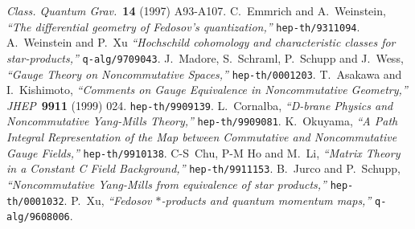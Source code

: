 \documentclass[10pt,a4paper]{article}
\begin{document}
\begin{thebibliography}{99}
{\sl Class. Quantum Grav.}~{\bf 14} (1997) A93-A107.
C.~Emmrich and A.~Weinstein,
{\it ``The differential geometry of Fedosov's quantization,''}
{\tt hep-th/9311094}.
A.~Weinstein and P.~Xu
{\it ``Hochschild cohomology and characteristic classes for star-products,''}
{\tt q-alg/9709043}.
J.~Madore, S.~Schraml, P.~Schupp and J.~Wess,
{\it ``Gauge Theory on Noncommutative Spaces,''}
{\tt hep-th/0001203}.
T.~Asakawa and I.~Kishimoto,
{\it ``Comments on Gauge Equivalence in Noncommutative Geometry,''}
{\sl JHEP}~{\bf 9911} (1999) 024. {\tt hep-th/9909139}.
L.~Cornalba,
{\it ``D-brane Physics and Noncommutative Yang-Mills Theory,''}
{\tt hep-th/9909081}.
K.~Okuyama,
{\it ``A Path Integral Representation of the Map between Commutative and Noncommutative Gauge Fields,''}
{\tt hep-th/9910138}.
C-S~Chu, P-M Ho and M.~Li,
{\it ``Matrix Theory in a Constant C Field Background,''}
{\tt hep-th/9911153}.
B.~Jurco and P.~Schupp,
{\it ``Noncommutative Yang-Mills from equivalence of star products,''}
{\tt hep-th/0001032}.
P.~Xu,
{\it ``Fedosov $*$-products and quantum momentum maps,''}
{\tt q-alg/9608006}.
\end{thebibliography}
\end{document}

